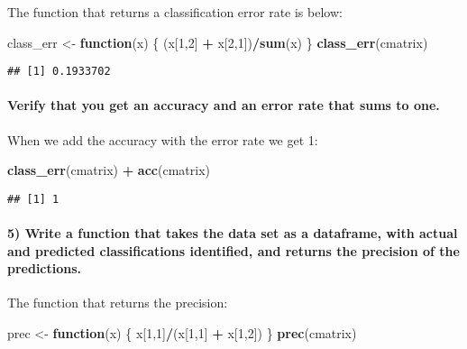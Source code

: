 \documentclass[]{article}
\newenvironment{Shaded}{\begin{snugshade}}{\end{snugshade}}
\newcommand{\KeywordTok}[1]{\textcolor[rgb]{0.13,0.29,0.53}{\textbf{#1}}}
\newcommand{\DecValTok}[1]{\textcolor[rgb]{0.00,0.00,0.81}{#1}}
\newcommand{\StringTok}[1]{\textcolor[rgb]{0.31,0.60,0.02}{#1}}
\newcommand{\ControlFlowTok}[1]{\textcolor[rgb]{0.13,0.29,0.53}{\textbf{#1}}}
\newcommand{\OperatorTok}[1]{\textcolor[rgb]{0.81,0.36,0.00}{\textbf{#1}}}
\newcommand{\NormalTok}[1]{#1}
\let\oldparagraph\paragraph
\renewcommand{\paragraph}[1]{\oldparagraph{#1}\mbox{}}
\begin{document}
The function that returns a classification error rate is below:

\begin{Shaded}
\begin{Highlighting}[]
\NormalTok{class_err <-}\StringTok{ }\ControlFlowTok{function}\NormalTok{(x) \{}
\NormalTok{  (x[}\DecValTok{1}\NormalTok{,}\DecValTok{2}\NormalTok{] }\OperatorTok{+}\StringTok{ }\NormalTok{x[}\DecValTok{2}\NormalTok{,}\DecValTok{1}\NormalTok{])}\OperatorTok{/}\KeywordTok{sum}\NormalTok{(x)}
\NormalTok{\}}
\KeywordTok{class_err}\NormalTok{(cmatrix)}
\end{Highlighting}
\end{Shaded}

\begin{verbatim}
## [1] 0.1933702
\end{verbatim}

\paragraph{Verify that you get an accuracy and an error rate that sums
to
one.}\label{verify-that-you-get-an-accuracy-and-an-error-rate-that-sums-to-one.}

When we add the accuracy with the error rate we get 1:

\begin{Shaded}
\begin{Highlighting}[]
\KeywordTok{class_err}\NormalTok{(cmatrix) }\OperatorTok{+}\StringTok{ }\KeywordTok{acc}\NormalTok{(cmatrix)}
\end{Highlighting}
\end{Shaded}

\begin{verbatim}
## [1] 1
\end{verbatim}

\paragraph{5) Write a function that takes the data set as a dataframe,
with actual and predicted classifications identified, and returns the
precision of the
predictions.}\label{write-a-function-that-takes-the-data-set-as-a-dataframe-with-actual-and-predicted-classifications-identified-and-returns-the-precision-of-the-predictions.}

The function that returns the precision:

\begin{Shaded}
\begin{Highlighting}[]
\NormalTok{prec <-}\StringTok{ }\ControlFlowTok{function}\NormalTok{(x) \{}
\NormalTok{  x[}\DecValTok{1}\NormalTok{,}\DecValTok{1}\NormalTok{]}\OperatorTok{/}\NormalTok{(x[}\DecValTok{1}\NormalTok{,}\DecValTok{1}\NormalTok{] }\OperatorTok{+}\StringTok{ }\NormalTok{x[}\DecValTok{1}\NormalTok{,}\DecValTok{2}\NormalTok{])}
\NormalTok{\}}
\KeywordTok{prec}\NormalTok{(cmatrix)}
\end{Highlighting}
\end{Shaded}
\end{document}
